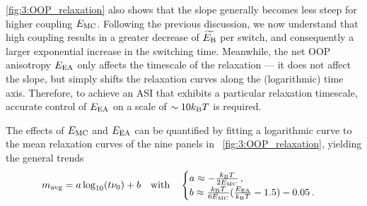 \cref{fig:3:OOP_relaxation} also shows that the slope generally becomes less steep for higher coupling $E_\mathrm{MC}$.
Following the previous discussion, we now understand that high coupling results in a greater decrease of $\widetilde{E_\mathrm{B}}$ per switch, and consequently a larger exponential increase in the switching time.
Meanwhile, the net OOP anisotropy $E_\mathrm{EA}$ only affects the timescale of the relaxation --- it does not affect the slope, but simply shifts the relaxation curves along the (logarithmic) time axis.
Therefore, to achieve an ASI that exhibits a particular relaxation timescale, accurate control of $E_\mathrm{EA}$ on a scale of $\sim 10\kBT$ is required. \par
The effects of $E_\mathrm{MC}$ and $E_\mathrm{EA}$ can be quantified by fitting a logarithmic curve to the mean relaxation curves of the nine panels in ~\cref{fig:3:OOP_relaxation}, yielding the general trends
\begin{equation}
	\mavg = a \log_{10}(t \nu_0) + b \quad \mathrm{with} \quad \begin{cases}
		a \approx -\frac{\kBT}{2\EMC} \, \mathrm{,} \\
		b \approx \frac{\kBT}{6\EMC}(\frac{\EEA}{\kBT} - 1.5) - 0.05 \, \mathrm{.}
	\end{cases}
\end{equation} %


